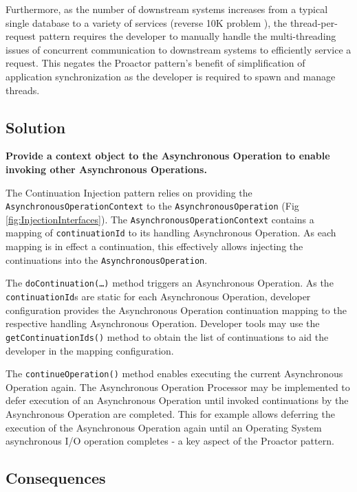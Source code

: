 \documentclass[prodmode]{style/acmlarge}
\begin{document}
Furthermore, as the number of downstream systems increases from a typical single
database to a variety of services (reverse 10K problem
\cite{reverse-ten-k-problem}), the thread-per-request pattern requires the
developer to manually handle the multi-threading issues of concurrent
communication to downstream systems to efficiently service a request.  This
negates the Proactor pattern's benefit of simplification of application
synchronization \cite[p. 7]{proactor} as the developer is required to spawn and
manage threads.


\subsection{Solution}

\textbf{Provide a context object to the Asynchronous Operation to enable invoking other Asynchronous Operations.}

The Continuation Injection pattern relies on providing the
\texttt{AsynchronousOperationContext} to the \texttt{AsynchronousOperation} (Fig
\ref{fig:InjectionInterfaces}).  The \texttt{AsynchronousOperationContext}
contains a mapping of \texttt{continuationId} to its handling Asynchronous
Operation.  As each mapping is in effect a continuation, this effectively allows
injecting the continuations into the \texttt{AsynchronousOperation}.

The \texttt{doContinuation(\ldots)} method triggers an Asynchronous Operation.
As the \texttt{continuationId}s are static for each Asynchronous Operation,
developer configuration provides the Asynchronous Operation continuation mapping
to the respective handling Asynchronous Operation.  Developer tools may use the
\texttt{getContinuationIds()} method to obtain the list of continuations to aid
the developer in the mapping configuration.

The \texttt{continueOperation()} method enables executing the current
Asynchronous Operation again.  The Asynchronous Operation Processor may be
implemented to defer execution of an Asynchronous Operation until invoked
continuations by the Asynchronous Operation are completed.  This for example
allows deferring the execution of the Asynchronous Operation again until an
Operating System asynchronous I/O operation completes - a key aspect of the
Proactor pattern.


\subsection{Consequences}
\end{document}
